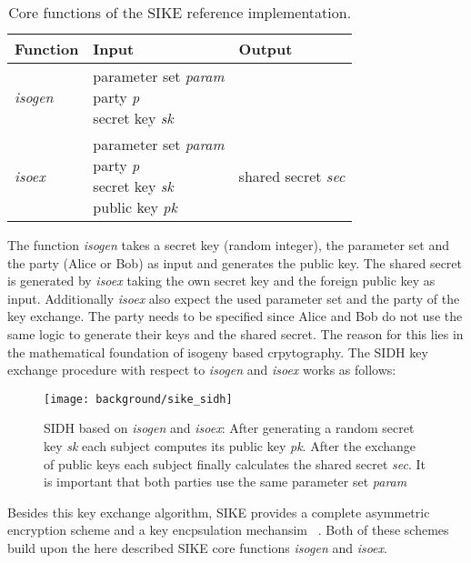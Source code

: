 \begin{table}[H]
  \centering
  \begin{tabular}{|K{3cm}|K{4cm}|K{4cm}|}
	\hline
      \textbf{Function} & \textbf{Input} & \textbf{Output} \\
	\hline
      \textit{isogen} & \parbox[t]{4cm}{\centering parameter set \textit{param}\\party \textit{p}\\ secret key \textit{sk}} &  \\
     \hline
      \textit{isoex} & \parbox[t]{4cm}{\centering parameter set \textit{param}\\party \textit{p}\\ secret key \textit{sk}\\ public key \textit{pk}} & shared secret \textit{sec}\\
     \hline
  \end{tabular}
   \caption[Core functions of the \gls{SIKE} reference implementation]{Core functions of the \gls{SIKE} reference implementation.}\label{tab:sike_core_functions}
\end{table}
The function \textit{isogen} takes a secret key (random integer), the parameter set and the party (Alice or Bob) as input and generates the public key. The shared secret is generated by \textit{isoex} taking the own secret key and the foreign public key as input. Additionally \textit{isoex} also expect the used parameter set and the party of the key exchange. The party needs to be specified since Alice and Bob do not use the same logic to generate their keys and the shared secret. The reason for this lies in the mathematical foundation of isogeny based crpytography. The \gls{SIDH} key exchange procedure with respect to \textit{isogen} and \textit{isoex} works as follows:
\begin{figure}[H]
  \centering
  \texttt{[image: background/sike\_sidh]}
  \caption[\gls{SIDH} based on \textit{isogen} and \textit{isoex}]{\gls{SIDH} based on \textit{isogen} and \textit{isoex}: After generating a random secret key \textit{sk} each subject computes its public key \textit{pk}. After the exchange of public keys each subject finally calculates the shared secret \textit{sec}. It is important that both parties use the same parameter set \textit{param}} \label{fig:sike-sidh}
\end{figure}
Besides this key exchange algorithm, \gls{SIKE} provides a complete asymmetric encryption scheme  and a key encpsulation mechansim  ~\parencite{sike2020spec}. Both of these schemes build upon the here described \gls{SIKE} core functions \textit{isogen} and \textit{isoex}.

